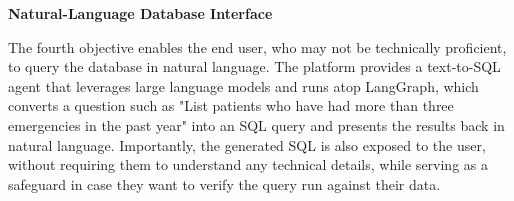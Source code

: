 \vspace{0.5em}
\noindent\textbf{Natural-Language Database Interface}

The fourth objective enables the end user, who may not be technically proficient, to query the database in natural language. The platform provides a text-to-SQL agent that leverages large language models and runs atop LangGraph, which converts a question such as "List patients who have had more than three emergencies in the past year" into an SQL query and presents the results back in natural language. Importantly, the generated SQL is also exposed to the user, without requiring them to understand any technical details, while serving as a safeguard in case they want to verify the query run against their data.
